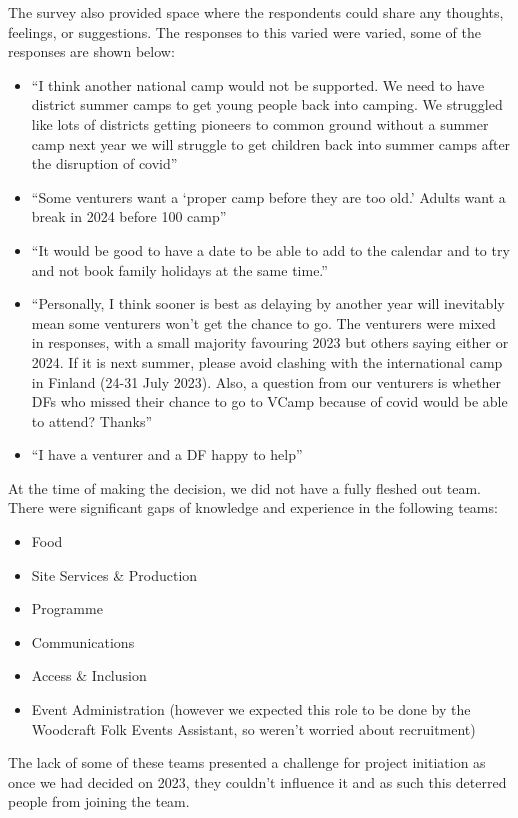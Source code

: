 The survey also provided space where the respondents could share any thoughts, feelings, or suggestions. The responses to this varied were varied, some of the responses are shown below:
\begin{itemize}
    \item ``I think another national camp would not be supported. We need to have district summer camps to get young people back into camping. We struggled like lots of districts getting pioneers to common ground without a summer camp next year we will struggle to get children back into summer camps after the disruption of covid''
    \item ``Some venturers want a `proper camp before they are too old.' Adults want a break in 2024 before 100 camp''
    \item ``It would be good to have a date to be able to add to the calendar and to try and not book family holidays at the same time.''
    \item ``Personally, I think sooner is best as delaying by another year will inevitably mean some venturers won't get the chance to go. The venturers were mixed in responses, with a small majority favouring 2023 but others saying either or 2024. If it is next summer, please avoid clashing with the international camp in Finland (24-31 July 2023). Also, a question from our venturers is whether DFs who missed their chance to go to VCamp because of covid would be able to attend? Thanks''
    \item ``I have a venturer and a DF happy to help''
\end{itemize}

At the time of making the decision, we did not have a fully fleshed out team. There were significant gaps of knowledge and experience in the following teams:
\begin{itemize}
    \item Food
    \item Site Services \& Production
    \item Programme
    \item Communications
    \item Access \& Inclusion
    \item Event Administration (however we expected this role to be done by the Woodcraft Folk Events Assistant, so weren't worried about recruitment)
\end{itemize}
The lack of some of these teams presented a challenge for project initiation as once we had decided on 2023, they couldn't influence it and as such this deterred people from joining the team.\\ 

